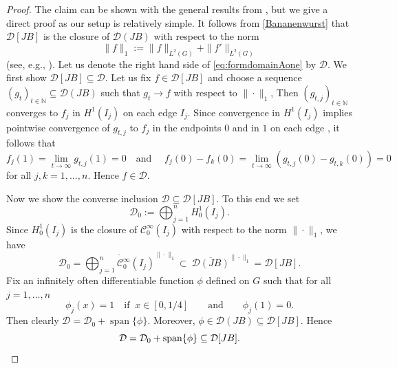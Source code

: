 \documentclass{article}
\numberwithin{equation}{section}
\theoremstyle{definition}
\newcommand{\N}{\mathbb{N}}
\newcommand{\mD}{\mathcal{D}}
\DeclareMathOperator{\linspan}{span}
\newcommand{\AKone}{B}
\begin{document}
\begin{proof}
   The claim can be shown with the general results from \cite[Theorem 1.4.11]{BerkolaikoKuchment}, but we give a direct proof as our setup is relatively simple. It follows from  \eqref{Bananenwurst} that $\mD[J\AKone]$ is the closure of $\mD(J\AKone)$ with respect to the norm
   \begin{equation*}
      \|f\|_1 := \|f\|_{L^2(G)} + \|f'\|_{L^2(G)}
   \end{equation*}
   (see, e.g., \cite[VI-§ 2.1]{K}). Let us denote the right hand side of \eqref{eq:formdomainAone} by $\mD$. We first show $\mD[J\AKone]\subseteq \mD$. Let us fix $f\in \mD[J\AKone]$ and choose a sequence $(g_t)_{t\in\N}\subseteq \mD(J\AKone)$ such that $g_t\rightarrow f$ with respect to $\|\cdot\|_1$, Then $(g_{t,j})_{t\in\N}$ converges to $f_j$ in $H^1(I_j)$ on each edge $I_j$. Since convergence in $H^1(I_j)$ implies pointwise convergence of $g_{t,j}$ to $f_j$ in the endpoints $0$ and in $1$ on each edge \cite[Lemma 1.3.8.]{BerkolaikoKuchment}, it follows that
   \begin{equation*}
      f_j(1) = \lim_{t\to\infty} g_{t,j}(1) = 0\quad\mbox{and } \quad f_j(0) - f_k(0) = \lim_{t\to\infty} ( g_{t,j}(0) - g_{t,k}(0)) = 0
   \end{equation*}
   for all $j,k= 1,\dots, n$. Hence $f\in \mD$.

   Now we show the converse inclusion $\mD\subseteq \mD[J\AKone]$. To this end we set 
   \begin{equation*}
      \mD_0 := \bigoplus_{j=1}^n H_0^1(I_j).
   \end{equation*}
   Since $H^1_0(I_j)$ is the closure of  $\mathcal C_0^\infty(I_j)$ with  respect to the norm $\|\cdot\|_1$, we have
   \begin{equation*}
      \mD_0 = \overline{\bigoplus_{j=1}^n \mathcal C_0^\infty(I_j)}^{\|\cdot\|_1} \subset\ \overline{\mD(J\AKone)}^{\|\cdot\|_1}= \mD[J\AKone].
   \end{equation*}
   Fix an infinitely often differentiable function 
   $\phi$ defined on $G$
   such that for all $j=1,\dots, n$
   \begin{equation*}
      \phi_j(x) = 1\quad\text{if }\ x\in [0,1/4]
      \qquad\text{and}\qquad
      \phi_j(1) = 0.
   \end{equation*}
   Then clearly $\mD = \mD_0 + \linspan\{ \phi\}$.
   Moreover, $\phi\in \mD(J\AKone)\subseteq \mD[J\AKone]$.
   Hence  
   \begin{equation*}
      \mD = \mD_0 + \linspan\{ \phi\}\subseteq \mD[J\AKone].
      \qedhere
   \end{equation*}
\end{proof}
\end{document}
